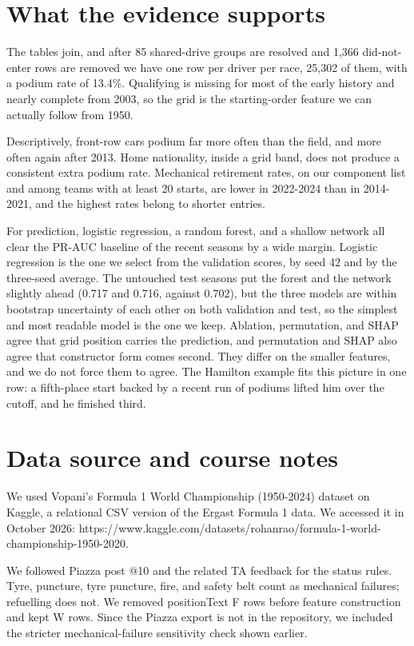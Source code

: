\documentclass[10pt,a4paper]{article}
\begin{document}
\section{What the evidence supports}


The tables join, and after 85 shared-drive groups are resolved and 1,366 did-not-enter rows are removed we have one row per driver per race, 25,302 of them, with a podium rate of 13.4\%. Qualifying is missing for most of the early history and nearly complete from 2003, so the grid is the starting-order feature we can actually follow from 1950.


Descriptively, front-row cars podium far more often than the field, and more often again after 2013. Home nationality, inside a grid band, does not produce a consistent extra podium rate. Mechanical retirement rates, on our component list and among teams with at least 20 starts, are lower in 2022-2024 than in 2014-2021, and the highest rates belong to shorter entries.


For prediction, logistic regression, a random forest, and a shallow network all clear the PR-AUC baseline of the recent seasons by a wide margin. Logistic regression is the one we select from the validation scores, by seed 42 and by the three-seed average. The untouched test seasons put the forest and the network slightly ahead (0.717 and 0.716, against 0.702), but the three models are within bootstrap uncertainty of each other on both validation and test, so the simplest and most readable model is the one we keep. Ablation, permutation, and SHAP agree that grid position carries the prediction, and permutation and SHAP also agree that constructor form comes second. They differ on the smaller features, and we do not force them to agree. The Hamilton example fits this picture in one row: a fifth-place start backed by a recent run of podiums lifted him over the cutoff, and he finished third.



\section{Data source and course notes}


We used Vopani's Formula 1 World Championship (1950-2024) dataset on Kaggle, a relational CSV version of the Ergast Formula 1 data. We accessed it in October 2026: https://www.kaggle.com/datasets/rohanrao/formula-1-world-championship-1950-2020.


We followed Piazza post @10 and the related TA feedback for the status rules. Tyre, puncture, tyre puncture, fire, and safety belt count as mechanical failures; refuelling does not. We removed positionText F rows before feature construction and kept W rows. Since the Piazza export is not in the repository, we included the stricter mechanical-failure sensitivity check shown earlier.
\end{document}
